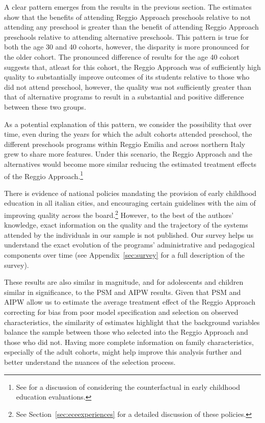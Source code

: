 A clear pattern emerges from the results in the previous section. The estimates show that the benefits of attending Reggio Approach preschools relative to not attending any preschool is greater than the benefit of attending Reggio Approach preschools relative to attending alternative preschools. This pattern is true for both the age 30 and 40 cohorts, however, the disparity is more pronounced for the older cohort. The pronounced difference of results for the age 40 cohort suggests that, atleast for this cohort, the Reggio Approach was of sufficiently high quality to substantially improve outcomes of its students relative to those who did not attend preschool, however, the quality was not sufficiently greater than that of alternative programs to result in a substantial and positive difference between these two groups.

As a potential explanation of this pattern, we consider the possibility that over time, even during the years for which the adult cohorts attended preschool, the different preschools programs within Reggio Emilia and across northern Italy grew to share more features. Under this scenario, the Reggio Approach and the alternatives would become more similar reducing the estimated treatment effects of the Reggio Approach.\footnote{See \citet{Elango_Hojman_etal_2016_Early-Edu} for a discussion of considering the counterfactual in early childhood education evaluations.} 

There is evidence of national policies mandating the provision of early childhood education in all italian cities, and encouraging certain guidelines with the aim of improving quality across the board.\footnote{See Section~\ref{sec:eceexperiences} for a detailed discussion of these policies.} However, to the best of the authors' knowledge, exact information on the quality and the trajectory of the systems attended by the individuals in our sample is not published. Our survey helps us understand the exact evolution of the programs' administrative and pedagogical components over time (see Appendix~\ref{sec:survey} for a full description of the survey). 


These results are also similar in magnitude, and for adolescents and children similar in significance, to the PSM and AIPW results. Given that PSM and AIPW allow us to estimate the average treatment effect of the Reggio Approach correcting for bias from poor model specification and selection on observed characteristics, the similarity of estimates highlight that the background variables balance the sample between those who selected into the Reggio Approach and those who did not. Having more complete information on family characteristics, especially of the adult cohorts, might help improve this analysis further and better understand the nuances of the selection process. 

